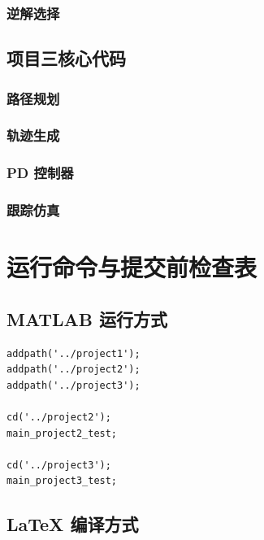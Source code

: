 \subsection{逆解选择}


\section{项目三核心代码}

\subsection{路径规划}


\subsection{轨迹生成}


\subsection{PD 控制器}


\subsection{跟踪仿真}


\chapter{运行命令与提交前检查表}

\section{MATLAB 运行方式}

\begin{lstlisting}
addpath('../project1');
addpath('../project2');
addpath('../project3');

cd('../project2');
main_project2_test;

cd('../project3');
main_project3_test;
\end{lstlisting}

\section{LaTeX 编译方式}

